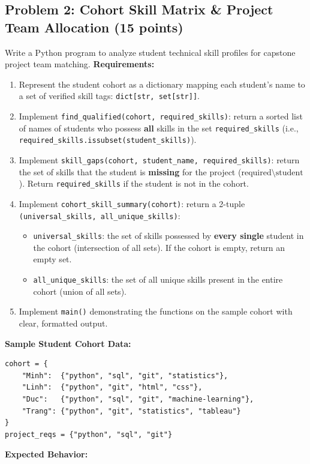 \documentclass[11pt,a4paper]{article}
\begin{document}
\subsection*{Problem 2: Cohort Skill Matrix \& Project Team Allocation (15 points)}
Write a Python program to analyze student technical skill profiles for capstone project team matching.
\textbf{Requirements:}
\begin{enumerate}[label=\arabic*.,leftmargin=2em,itemsep=1.5pt]
\item Represent the student cohort as a dictionary mapping each student's name to a set of verified skill tags: \texttt{dict[str, set[str]]}.
\item Implement \texttt{find\_qualified(cohort, required\_skills)}: return a sorted list of names of students who possess \textbf{all} skills in the set \texttt{required\_skills} (i.e., \texttt{required\_skills.issubset(student\_skills)}).
\item Implement \texttt{skill\_gaps(cohort, student\_name, required\_skills)}: return the set of skills that the student is \textbf{missing} for the project ($\text{required} \setminus \text{student}$). Return \texttt{required\_skills} if the student is not in the cohort.
\item Implement \texttt{cohort\_skill\_summary(cohort)}: return a 2-tuple \texttt{(universal\_skills, all\_unique\_skills)}:
  \begin{itemize}
  \item \texttt{universal\_skills}: the set of skills possessed by \textbf{every single} student in the cohort (intersection of all sets). If the cohort is empty, return an empty set.
  \item \texttt{all\_unique\_skills}: the set of all unique skills present in the entire cohort (union of all sets).
  \end{itemize}
\item Implement \texttt{main()} demonstrating the functions on the sample cohort with clear, formatted output.
\end{enumerate}
\textbf{Sample Student Cohort Data:}\\[-0.1em]
\begin{lstlisting}
cohort = {
    "Minh":  {"python", "sql", "git", "statistics"},
    "Linh":  {"python", "git", "html", "css"},
    "Duc":   {"python", "sql", "git", "machine-learning"},
    "Trang": {"python", "git", "statistics", "tableau"}
}
project_reqs = {"python", "sql", "git"}
\end{lstlisting}
\textbf{Expected Behavior:}
\end{document}
